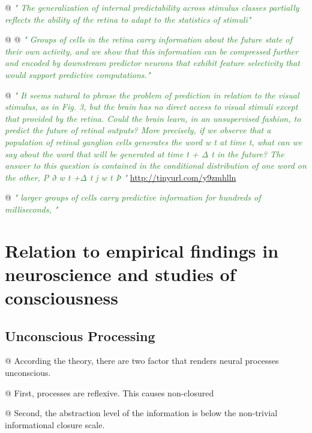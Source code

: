 \documentclass[utf8]{article}
\newenvironment{ants}
			{
			 \begin{easylist}[itemize]		
		 	}
			{
			\end{easylist}
			}
\newcommand{\rewrite}[1]{\textcolor{ForestGreen}{\textit{"#1"}}\newline}
\begin{document}
\begin{ants}
			@ \rewrite{
				The generalization of internal predictability across stimulus classes partially reflects the ability of the retina to adapt to the statistics of stimuli}
			
			
			@ \cite{Palmer2015}
			@ \rewrite{
				Groups of cells in the retina carry information about the future state of their own activity, and we show that this information can be compressed further and encoded by downstream predictor neurons that exhibit feature selectivity that would support predictive computations.}
			
			@ \rewrite{
				It seems natural to phrase the problem of prediction in relation to the visual stimulus, as in Fig. 3, but the brain has no direct access to visual stimuli except that provided by the retina. Could the brain learn, in an unsupervised fashion, to predict the future of retinal outputs? More precisely, if we observe that a population of retinal ganglion cells generates the word w t at time t, what can we say about the word that will be generated at time t + Δ t in the future? The answer to this question is contained in the conditional distribution of one word on the other, P ð w t +Δ t j w t Þ } \url{http://tinyurl.com/y9zmhlln}	
			
			@ \rewrite{
				larger groups of cells carry predictive information for hundreds of milliseconds, }
			
		\end{ants}




	\section*{Relation to empirical findings in neuroscience and studies of consciousness}

		\subsection{Unconscious Processing}
		\begin{ants}
			@ According the theory, there are two factor that renders neural processes unconscious. 
			
			@ First, processes are reflexive. This causes non-closured
			
			@ Second, the abstraction level of the information is below the non-trivial informational closure scale. 
		\end{ants}
		
		
		
\end{document}

